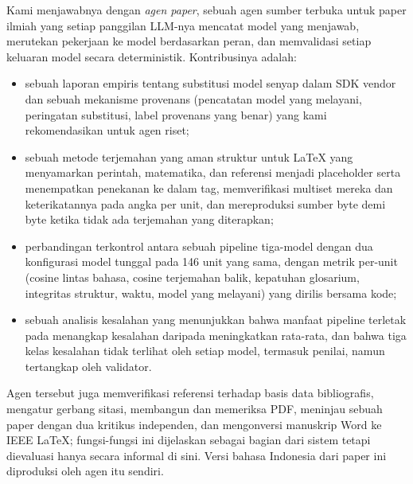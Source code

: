 Kami menjawabnya dengan \emph{agen paper}, sebuah agen sumber terbuka untuk paper ilmiah yang setiap panggilan LLM-nya mencatat model yang menjawab, merutekan pekerjaan ke model berdasarkan peran, dan memvalidasi setiap keluaran model secara deterministik. Kontribusinya adalah:
\begin{itemize}
  \item sebuah laporan empiris tentang substitusi model senyap dalam SDK vendor dan sebuah mekanisme provenans (pencatatan model yang melayani, peringatan substitusi, label provenans yang benar) yang kami rekomendasikan untuk agen riset;
  \item sebuah metode terjemahan yang aman struktur untuk LaTeX yang menyamarkan perintah, matematika, dan referensi menjadi placeholder serta menempatkan penekanan ke dalam tag, memverifikasi multiset mereka dan keterikatannya pada angka per unit, dan mereproduksi sumber byte demi byte ketika tidak ada terjemahan yang diterapkan;
  \item perbandingan terkontrol antara sebuah pipeline tiga-model dengan dua konfigurasi model tunggal pada 146 unit yang sama, dengan metrik per-unit (cosine lintas bahasa, cosine terjemahan balik, kepatuhan glosarium, integritas struktur, waktu, model yang melayani) yang dirilis bersama kode;
  \item sebuah analisis kesalahan yang menunjukkan bahwa manfaat pipeline terletak pada menangkap kesalahan daripada meningkatkan rata-rata, dan bahwa tiga kelas kesalahan tidak terlihat oleh setiap model, termasuk penilai, namun tertangkap oleh validator.
\end{itemize}
Agen tersebut juga memverifikasi referensi terhadap basis data bibliografis, mengatur gerbang sitasi, membangun dan memeriksa PDF, meninjau sebuah paper dengan dua kritikus independen, dan mengonversi manuskrip Word ke IEEE LaTeX; fungsi-fungsi ini dijelaskan sebagai bagian dari sistem tetapi dievaluasi hanya secara informal di sini. Versi bahasa Indonesia dari paper ini diproduksi oleh agen itu sendiri.
